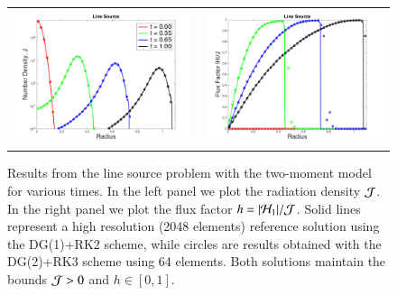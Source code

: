 \documentclass[11pt,letterpaper,twoside,english,final]{article}
\begin{document}
\begin{figure}
  \centering
  \begin{tabular}{cc}
    \includegraphics[scale=0.4]{./Figures/LineSource1D_Density.png} &
    \includegraphics[scale=0.4]{./Figures/LineSource1D_FluxFactor.png}
  \end{tabular}
  \vspace{-0.1in}
  \flushleft\caption[Results from the line source problem with the two-moment model for various times.]{Results from the line source problem with the two-moment model for various times.  \textmd{In the left panel we plot the radiation density $\mathcal{J}$.  In the right panel we plot the flux factor $h=|\mathcal{H}_{1}|/\mathcal{J}$.  Solid lines represent a high resolution (2048 elements) reference solution using the DG(1)+RK2 scheme, while circles are results obtained with the DG(2)+RK3 scheme using 64 elements.  Both solutions maintain the bounds $\mathcal{J}>0$ and $h\in[0,1]$.}}
  \label{fig:lineSource}
\end{figure}
\end{document}
